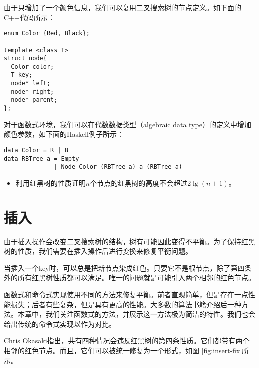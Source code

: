 \documentclass[UTF8]{article}
\begin{document}
由于只增加了一个颜色信息，我们可以复用二叉搜索树的节点定义。如下面的C++代码所示：

\lstset{language=C++}
\begin{lstlisting}
enum Color {Red, Black};

template <class T>
struct node{
  Color color;
  T key;
  node* left;
  node* right;
  node* parent;
};
\end{lstlisting}

对于函数式环境，我们可以在代数数据类型（algebraic data type）的定义中增加颜色参数，如下面的Haskell例子所示：

\lstset{language=Haskell}
\begin{lstlisting}
data Color = R | B
data RBTree a = Empty
              | Node Color (RBTree a) a (RBTree a)
\end{lstlisting}

\begin{Exercise}

\begin{itemize}
\item 利用红黑树的性质证明$n$个节点的红黑树的高度不会超过$2 \lg (n+1)$。
\end{itemize}

\end{Exercise}

\section{插入}

由于插入操作会改变二叉搜索树的结构，树有可能因此变得不平衡。为了保持红黑树的性质，我们需要在插入操作后进行变换来修复平衡问题。

当插入一个key时，可以总是把新节点染成红色。只要它不是根节点，除了第四条外的所有红黑树性质都可以满足。唯一的问题就是可能引入两个相邻的红色节点。

函数式和命令式实现使用不同的方法来修复平衡。前者直观简单，但是存在一点性能损失；后者有些复杂，但是具有更高的性能。大多数的算法书籍介绍后一种方法。本章中，我们关注函数式的方法，并展示这一方法极为简洁的特性。我们也会给出传统的命令式实现以作为对比。

Chris Okasaki指出，共有四种情况会违反红黑树的第四条性质。它们都带有两个相邻的红色节点。而且，它们可以被统一修复为一个形式\cite{okasaki}，如图 \ref{fig:insert-fix}所示。
\end{document}

